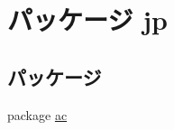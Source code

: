 \hypertarget{namespacejp}{\section{パッケージ jp}
\label{namespacejp}
}
\subsection*{パッケージ}
\begin{DoxyCompactItemize}
\item 
package \hyperlink{namespacejp_1_1ac}{ac}
\end{DoxyCompactItemize}
